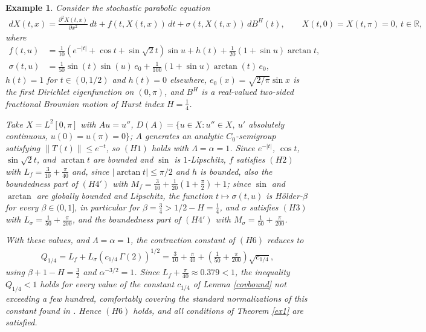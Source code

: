 \documentclass[11pt]{amsart}
\newtheorem{example}[theorem]{Example}
\begin{document}
\begin{example}
Consider the stochastic parabolic equation
\begin{align*}
dX(t,x)=\frac{\partial^2 X(t,x)}{\partial x^2}\,dt+f(t,X(t,x))\,dt+\sigma(t,X(t,x))\,dB^H(t),\qquad X(t,0)=X(t,\pi)=0,\ t\in\mathbb R,
\end{align*}
where
\begin{align*}
f(t,u)&=\frac1{10}\left(e^{-|t|}+\cos t+\sin\sqrt2 t\right)\sin u+h(t)+\frac1{20}(1+\sin u)\arctan t,\\
\sigma(t,u)&=\frac1{50}\sin(t)\sin(u)\,e_0+\frac1{100}(1+\sin u)\arctan(t)\,e_0,
\end{align*}
$h(t)=1$ for $t\in(0,1/2)$ and $h(t)=0$ elsewhere, $e_0(x)=\sqrt{2/\pi}\sin x$ is the first Dirichlet eigenfunction on $(0,\pi)$, and $B^H$ is a real-valued two-sided fractional Brownian motion of Hurst index $H=\tfrac14$.

Take $X=L^2[0,\pi]$ with $A u=u''$, $D(A)=\{u\in X:u''\in X,\ u'$ absolutely continuous, $u(0)=u(\pi)=0\}$; $A$ generates an analytic $C_0$-semigroup satisfying $\|T(t)\|\le e^{-t}$, so $(H1)$ holds with $\Lambda=\alpha=1$. Since $e^{-|t|}$, $\cos t$, $\sin\sqrt2 t$, and $\arctan t$ are bounded and $\sin$ is $1$-Lipschitz, $f$ satisfies $(H2)$ with $L_f=\tfrac3{10}+\tfrac\pi{40}$ and, since $|\arctan t|\le\pi/2$ and $h$ is bounded, also the boundedness part of $(H4')$ with $M_f=\tfrac3{10}+\tfrac1{20}\left(1+\tfrac\pi2\right)+1$; since $\sin$ and $\arctan$ are globally bounded and Lipschitz, the function $t\mapsto\sigma(t,u)$ is H\"older-$\beta$ for every $\beta\in(0,1]$, in particular for $\beta=\tfrac34>1/2-H=\tfrac14$, and $\sigma$ satisfies $(H3)$ with $L_\sigma=\tfrac1{50}+\tfrac\pi{200}$, and the boundedness part of $(H4')$ with $M_\sigma=\tfrac1{50}+\tfrac\pi{200}$.

With these values, and $\Lambda=\alpha=1$, the contraction constant of $(H6)$ reduces to
\begin{align*}
Q_{1/4}=L_f+L_\sigma\left(c_{1/4}\,\Gamma(2)\right)^{1/2}=\frac3{10}+\frac\pi{40}+\left(\frac1{50}+\frac\pi{200}\right)\sqrt{c_{1/4}},
\end{align*}
using $\beta+1-H=\tfrac32$ and $\alpha^{-3/2}=1$. Since $L_f+\tfrac\pi{40}\approx0.379<1$, the inequality $Q_{1/4}<1$ holds for every value of the constant $c_{1/4}$ of Lemma \ref{covbound} not exceeding a few hundred, comfortably covering the standard normalizations of this constant found in \cite{DHP}. Hence $(H6)$ holds, and all conditions of Theorem \ref{ex1} are satisfied.


\end{example}
\end{document}
